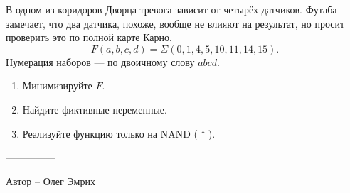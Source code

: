 \question
В одном из коридоров Дворца тревога зависит от четырёх датчиков. Футаба замечает, что два датчика, похоже, вообще не влияют на результат, но просит проверить это по полной карте Карно.
\[
F(a,b,c,d)=\Sigma(0,1,4,5,10,11,14,15).
\]
Нумерация наборов --- по двоичному слову $abcd$.
\begin{enumerate}
\item Минимизируйте $F$.
\item Найдите фиктивные переменные.
\item Реализуйте функцию только на NAND ($\uparrow$).
\end{enumerate}

---------------

Автор -- Олег Эмрих
